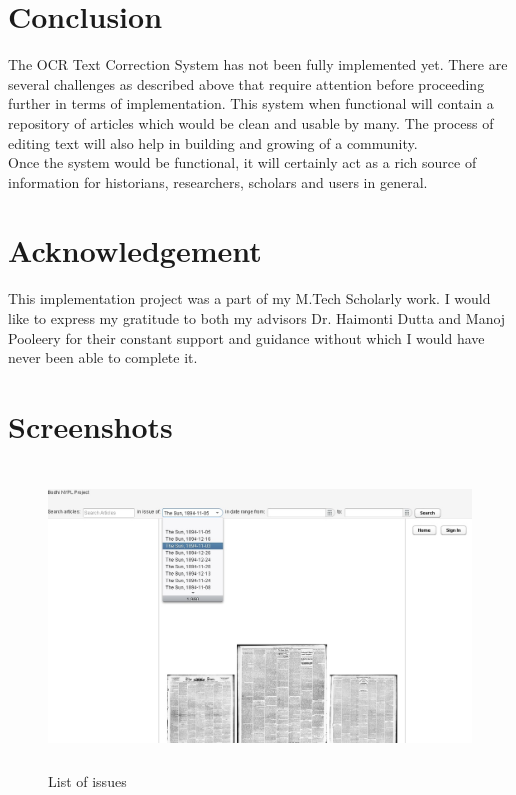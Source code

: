 \documentclass[12pt]{article}
\begin{document}
\section{Conclusion}
The OCR \cite{OCR} Text Correction System has not been fully implemented yet. There are several challenges as described above that require attention before proceeding further in terms of implementation. This system when functional will contain a repository of articles which would be clean and usable by many. The process of editing text will also help in building and growing of a community.\\
Once the system would be functional, it will certainly act as a rich source of information for historians, researchers, scholars and users in general.\\

\section{Acknowledgement}
This implementation project was a part of my M.Tech Scholarly work. I would like to express my gratitude to both my advisors Dr. Haimonti Dutta and Manoj Pooleery for their constant support and guidance without which I would have never been able to complete it.

\nocite{cdnc,OCR,eval,noisy,book,eclipse,vaadin,tomcat,ant,postgres,svn,ER}



\appendix
\appendixpage
\addappheadtotoc

\section{Screenshots}


\begin{figure}[H]
\centering
\includegraphics[width=14cm,height=8cm]{dropdown.jpg}
\caption{List of issues}
\label{fig:5}
\end{figure}
\end{document}
